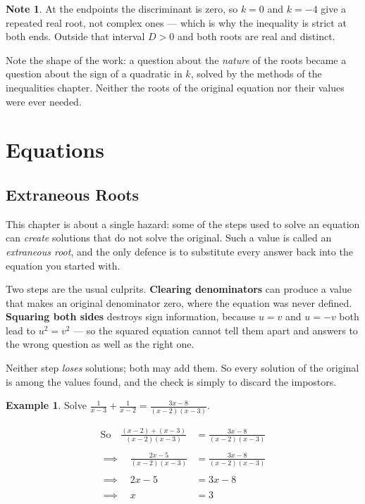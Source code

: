 \documentclass[11pt,a4paper]{article}
\theoremstyle{definition}
\newtheorem{example}[thm]{Example}
\newtheorem{note}[thm]{Note}
\begin{document}
\begin{note}
At the endpoints the discriminant is zero, so $k=0$ and $k=-4$ give a repeated
real root, not complex ones --- which is why the inequality is strict at both ends.
Outside that interval $D>0$ and both roots are real and distinct.

Note the shape of the work: a question about the \emph{nature} of the roots became
a question about the sign of a quadratic in $k$, solved by the methods of the
inequalities chapter. Neither the roots of the original equation nor their values
were ever needed.
\end{note}

\section{Equations}

\subsection{Extraneous Roots}
This chapter is about a single hazard: some of the steps used to solve an equation
can \emph{create} solutions that do not solve the original. Such a value is called
an \emph{extraneous root}, and the only defence is to substitute every answer back
into the equation you started with.

Two steps are the usual culprits. \textbf{Clearing denominators} can produce a
value that makes an original denominator zero, where the equation was never
defined. \textbf{Squaring both sides} destroys sign information, because $u=v$ and
$u=-v$ both lead to $u^{2}=v^{2}$ --- so the squared equation cannot tell them
apart and answers to the wrong question as well as the right one.

Neither step \emph{loses} solutions; both may add them. So every solution of the
original is among the values found, and the check is simply to discard the
impostors.

\begin{example}
Solve $\frac{1}{x-3}+\frac{1}{x-2}=\frac{3x-8}{(x-2)(x-3)}$.
\end{example}


\begin{align*}
\text{So}\quad  \frac{(x-2)+(x-3)}{(x-2)(x-3)} & = \frac{3x-8}{(x-2)(x-3)}\\\\
\implies \quad  \frac{2x-5}{(x-2)(x-3)} & = \frac{3x-8}{(x-2)(x-3)}\\\\
\implies \quad  2x-5 & = 3x-8\\\\
\implies \quad  x & = 3\\
\end{align*}
\end{document}
